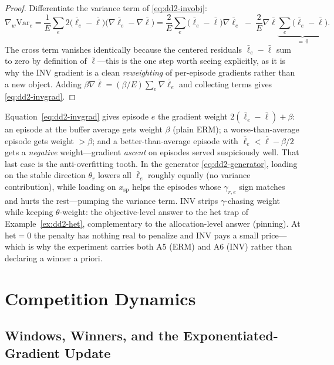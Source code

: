\documentclass[11pt,a4paper]{article}
\theoremstyle{definition}
\theoremstyle{plain}
\newcommand{\Var}{\mathrm{Var}}
\begin{document}
\begin{proof}
Differentiate the variance term of \eqref{eq:dd2-invobj}:
\[
\nabla_w \Var_e
= \frac{1}{E} \sum_{e} 2\bigl(\bar\ell_e - \bar\ell\bigr)
\bigl(\nabla \bar\ell_e - \nabla \bar\ell\bigr)
= \frac{2}{E} \sum_{e} \bigl(\bar\ell_e - \bar\ell\bigr) \nabla \bar\ell_e
\;-\; \frac{2}{E} \nabla \bar\ell \underbrace{\sum_{e} \bigl(\bar\ell_e - \bar\ell\bigr)}_{=\,0}.
\]
The cross term vanishes identically because the centered residuals
$\bar\ell_e - \bar\ell$ sum to zero by definition of $\bar\ell$---this is the
one step worth seeing explicitly, as it is why the INV gradient is a clean
\emph{reweighting} of per-episode gradients rather than a new object. Adding
$\beta \nabla \bar\ell = (\beta/E) \sum_e \nabla \bar\ell_e$ and collecting
terms gives \eqref{eq:dd2-invgrad}.
\end{proof}

\begin{intuition}[title={Reading the INV weights}]
Equation~\eqref{eq:dd2-invgrad} gives episode $e$ the gradient weight
$2(\bar\ell_e - \bar\ell) + \beta$: an episode at the buffer average gets
weight $\beta$ (plain ERM); a worse-than-average episode gets weight
$> \beta$; and a better-than-average episode with
$\bar\ell_e < \bar\ell - \beta/2$ gets a \emph{negative} weight---gradient
\emph{ascent} on episodes served suspiciously well. That last case is the
anti-overfitting tooth. In the generator \eqref{eq:dd2-generator}, loading
on the stable direction $\theta_r$ lowers all $\bar\ell_e$ roughly equally
(no variance contribution), while loading on $x_{\mathrm{sp}}$ helps the
episodes whose $\gamma_{r,e}$ sign matches and hurts the rest---pumping the
variance term. INV strips $\gamma$-chasing weight while keeping
$\theta$-weight: the objective-level answer to the het trap of
Example~\ref{ex:dd2-het}, complementary to the allocation-level answer
(pinning). At $\mathrm{het} = 0$ the penalty has nothing real to penalize
and INV pays a small price---which is why the experiment carries both A5
(ERM) and A6 (INV) rather than declaring a winner a priori.
\end{intuition}

\section{Competition Dynamics}
\label{sec:dd2-competition}

\subsection{Windows, Winners, and the Exponentiated-Gradient Update}
\end{document}
